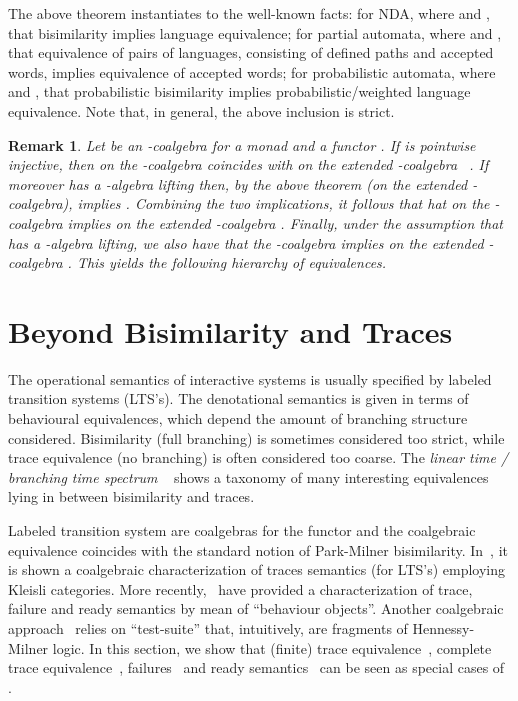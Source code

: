 \documentclass{LMCS}
\newtheorem*{remark}{Remark}
\begin{document}
The above theorem  instantiates to the well-known facts: for NDA, where  and ,  that bisimilarity implies language
equivalence; for partial automata,  where  and , that equivalence of pairs of languages, consisting
of defined paths and accepted words, implies
equivalence of accepted words; for probabilistic automata, where  and , that probabilistic
bisimilarity implies probabilistic/weighted language equivalence. Note that, in general, the
above inclusion is strict.

\begin{remark}
Let  be an -coalgebra for a monad  and a functor . If
 is pointwise injective, then
 on the
-coalgebra  coincides with  on the extended
-coalgebra
~\cite{Rutten00,bartels}. If moreover  has a
-algebra
lifting then, by the above theorem (on the extended -coalgebra),   implies
. Combining
the two implications, it follows that hat  on the
-coalgebra  implies
 on the extended  -coalgebra . Finally,
under the assumption that  has a -algebra lifting, we also have
that 
the -coalgebra  implies  on the extended
-coalgebra
. This yields the following hierarchy of equivalences.

\end{remark}



\section{Beyond Bisimilarity and Traces}\label{secbbat}
The operational semantics of interactive systems is
usually specified by labeled transition systems (LTS's). The denotational semantics is given in terms of behavioural
equivalences, which depend the amount of branching structure
considered. Bisimilarity (full branching) is sometimes considered
too strict, while trace equivalence (no
branching) is often considered too coarse. The \emph{linear time / branching time spectrum}
~\cite{Glabbeek90} shows a taxonomy of many interesting equivalences lying in between bisimilarity and traces.



Labeled transition system are coalgebras for the functor  and the coalgebraic equivalence  coincides
with the standard notion of Park-Milner bisimilarity. In~\cite{PowerTuri}, it is shown a coalgebraic
characterization of traces semantics (for LTS's) employing Kleisli categories. 
More recently,~\cite{Monteiro08} have provided a characterization of trace, failure and
ready semantics by mean of ``behaviour objects''. Another coalgebraic approach~\cite{Klin04} relies on ``test-suite'' that, intuitively, 
are fragments of Hennessy-Milner logic.
In this section, we show that (finite) trace equivalence~\cite{Hoare78}, complete trace equivalence~\cite{Glabbeek90},
failures~\cite{BrookesHR84} and ready semantics~\cite{OlderogH86}
can be seen as special cases of .
\end{document}
